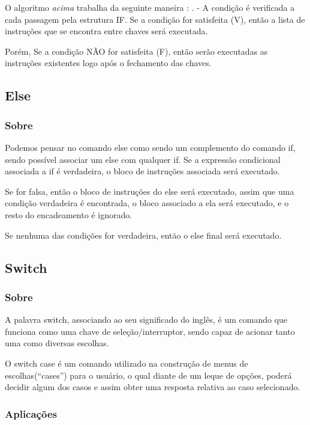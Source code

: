 \documentclass[a4paper,12pt]{article}  %
\begin{document}
  O algoritmo \textit{acima} trabalha da seguinte maneira : \newline
.  
  -  A condição é verificada a cada passagem pela estrutura IF. Se a condição for satisfeita (V), então a lista de instruções que se encontra entre chaves será executada. \par
  Porém, Se a condição NÃO for satisfeita (F), então serão executadas as instruções existentes logo após o fechamento das chaves.
 
 \subsection{Else}
 \subsubsection{Sobre} %

   Podemos pensar no comando else como sendo um complemento do comando if, sendo possível associar um else com qualquer if. Se a expressão condicional associada a if é verdadeira, o bloco de instruções associada será executado. \par 
   Se for falsa, então o bloco de instruções do else será executado, assim que uma condição verdadeira é encontrada, o bloco associado a ela será executado, e o resto do encadeamento é ignorado. \par
Se nenhuma das condições for verdadeira, então o else final será executado.

  
 \subsection{Switch}
 \subsubsection{Sobre} %
    
   A palavra switch, associando ao seu significado do inglês, é um comando que funciona como uma chave de seleção/interruptor, sendo capaz de acionar tanto uma como diversas escolhas. \par
   O switch case é um comando utilizado na construção de menus de escolhas(“cases”) para o usuário, o qual diante de um leque de opções, poderá decidir algum dos casos e assim obter uma resposta relativa ao caso selecionado.
 

  \subsubsection{Aplicações}
\end{document}
